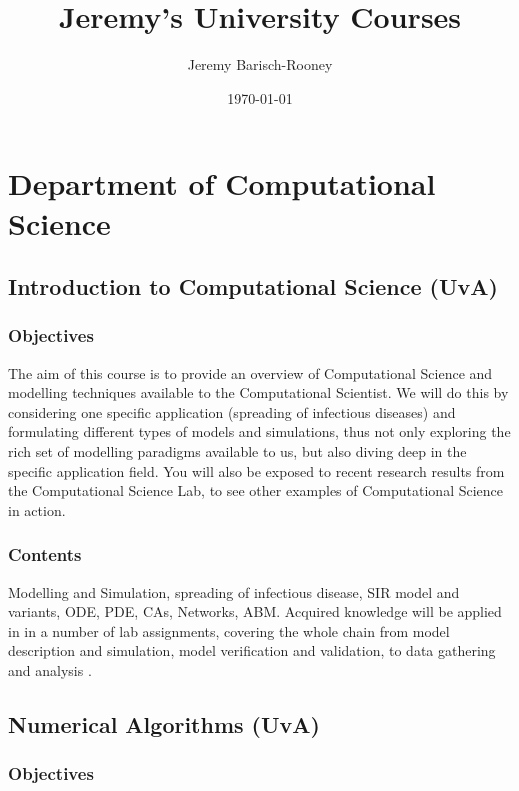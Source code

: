 \documentclass[11pt]{article}
\author{Jeremy Barisch-Rooney}
\date{\today}
\title{Jeremy's University Courses}
\begin{document}
\maketitle
\tableofcontents


\section{Department of Computational Science}
\label{sec:orgf4037c9}

\subsection{Introduction to Computational Science (UvA)}
\label{sec:org9a4d46f}

\subsubsection{Objectives}
\label{sec:orgaf48804}

The aim of this course is to provide an overview of Computational Science and
modelling techniques available to the Computational Scientist. We will do this
by considering one specific application (spreading of infectious diseases) and
formulating different types of models and simulations, thus not only exploring
the rich set of modelling paradigms available to us, but also diving deep in the
specific application field. You will also be exposed to recent research results
from the Computational Science Lab, to see other examples of Computational
Science in action.

\subsubsection{Contents}
\label{sec:org49f6142}

Modelling and Simulation, spreading of infectious disease, SIR model and
variants, ODE, PDE, CAs, Networks, ABM. Acquired knowledge will be applied in in
a number of lab assignments, covering the whole chain from model description and
simulation, model verification and validation, to data gathering and analysis .

\subsection{Numerical Algorithms (UvA)}
\label{sec:orga64f017}

\subsubsection{Objectives}
\label{sec:org54c0a92}
\end{document}
